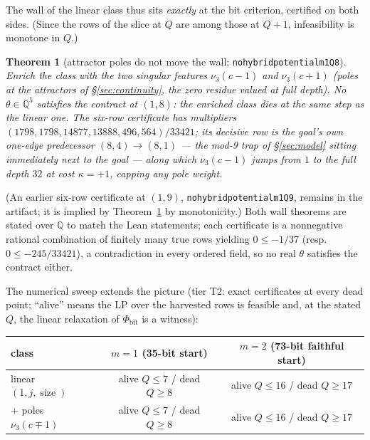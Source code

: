 \documentclass[11pt]{amsart}
\newtheorem{theorem}{Theorem}[section]
\theoremstyle{definition}
\theoremstyle{remark}
\newcommand{\size}{\operatorname{size}}
\newcommand{\lean}[1]{{\def\_{\textunderscore\allowbreak}\texttt{#1}}}
\newcommand{\Q}{\mathbb{Q}}
\newcommand{\nuthree}{\nu_3}
\begin{document}
The wall of the linear class thus sits \emph{exactly} at the bit criterion,
certified on both sides.  (Since the rows of the slice at $Q$ are among
those at $Q+1$, infeasibility is monotone in $Q$.)

\begin{theorem}[attractor poles do not move the wall;
\lean{no\_hybrid\_potential\_m1\_Q8}]\label{thm:hybrid}
Enrich the class with the two singular features $\nuthree(c-1)$ and
$\nuthree(c+1)$ (poles at the attractors of \S\ref{sec:continuity}, the zero
residue valued at full depth).  No $\theta \in \Q^5$ satisfies the contract
at $(1,8)$: the enriched class dies at the same step as the linear one.  The
six-row certificate has multipliers
$(1798,1798,14877,13888,496,564)/33421$; its decisive row is the goal's own
one-edge predecessor $(8,4) \to (8,1)$ --- the mod-9 trap of
\S\ref{sec:model} sitting immediately next to the goal --- along which
$\nuthree(c-1)$ jumps from $1$ to the full depth $32$ at cost $\kappa = +1$,
capping any pole weight.
\end{theorem}

(An earlier six-row certificate at $(1,9)$,
\lean{no\_hybrid\_potential\_m1\_Q9}, remains in the artifact; it is implied
by Theorem~\ref{thm:hybrid} by monotonicity.)  Both wall theorems are stated
over $\Q$ to match the Lean statements; each certificate is a nonnegative
rational combination of finitely many true rows yielding $0 \le -1/37$
(resp.\ $0 \le -245/33421$), a contradiction in every ordered field, so no
real $\theta$ satisfies the contract either.

The numerical sweep extends the picture (tier T2: exact certificates at
every dead point; ``alive'' means the LP over the harvested rows is feasible
and, at the stated $Q$, the linear relaxation of $\Phi_{\mathrm{bit}}$ is a
witness):

\begin{center}
\begin{tabular}{lcc}
\toprule
class & $m=1$ (35-bit start) & $m=2$ (73-bit faithful start)\\
\midrule
linear $(1, j, \size)$ & alive $Q \le 7$ / dead $Q \ge 8$ & alive $Q\le16$ / dead $Q\ge17$\\
$+$ poles $\nuthree(c\mp1)$ & alive $Q \le 7$ / dead $Q \ge 8$ & alive $Q\le16$ / dead $Q\ge17$\\
\bottomrule
\end{tabular}
\end{center}
\end{document}
